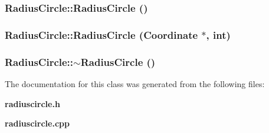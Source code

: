 \subsubsection{\setlength{\rightskip}{0pt plus 5cm}Radius\-Circle::Radius\-Circle ()}\label{classRadiusCircle_a0}


\subsubsection{\setlength{\rightskip}{0pt plus 5cm}Radius\-Circle::Radius\-Circle ({\bf Coordinate} $\ast$, int)}\label{classRadiusCircle_a1}


\subsubsection{\setlength{\rightskip}{0pt plus 5cm}Radius\-Circle::$\sim$Radius\-Circle ()}\label{classRadiusCircle_a2}




The documentation for this class was generated from the following files:\begin{CompactItemize}
\item 
{\bf radiuscircle.h}\item 
{\bf radiuscircle.cpp}\end{CompactItemize}
